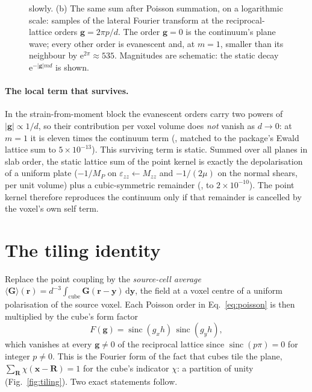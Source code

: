 \documentclass[extra,mreferee]{gji}
\newcommand{\bG}{\mathbf{G}}
\newcommand{\sinc}{\operatorname{sinc}}
\begin{document}
\begin{figure}
{slowly. (b) The same sum after Poisson summation, on a logarithmic scale: samples of the lateral Fourier
transform at the reciprocal-lattice orders $\mathbf g=2\pi p/d$. The order $\mathbf g=0$ is the
continuum's plane wave; every other order is evanescent and, at $m=1$, smaller than its neighbour by
$\mathrm{e}^{2\pi}\approx535$. Magnitudes are schematic: the static decay $\mathrm{e}^{-|\mathbf g|md}$ is
shown.}
\label{fig:poisson}
\par{}
\end{figure}

\paragraph{The local term that survives.} In the strain-from-moment block the evanescent orders carry two
powers of $|\mathbf g|\propto1/d$, so their contribution per voxel volume does \emph{not} vanish as
$d\to0$: at $m=1$ it is eleven times the continuum term (,
matched to the package's Ewald lattice sum to $5\times10^{-13}$). This surviving term is static.
Summed over all planes in slab order, the static lattice sum of the point kernel is exactly the
depolarisation of a uniform plate ($-1/M_P$ on $\varepsilon_{zz}\leftarrow M_{zz}$ and $-1/(2\mu)$
on the normal shears, per unit volume) plus a cubic-symmetric remainder
(, to $2\times10^{-10}$). The point kernel therefore reproduces
the continuum only if that remainder is cancelled by the voxel's own self term.

\section{The tiling identity}\label{sec:tiling}

Replace the point coupling by the \emph{source-cell average}
$\langle\bG\rangle(\mathbf r)=d^{-3}\int_{\text{cube}}\bG(\mathbf r-\mathbf y)\,\mathrm{d}\mathbf y$, the
field at a voxel centre of a uniform polarisation of the source voxel. Each Poisson order in
Eq.~\eqref{eq:poisson} is then multiplied by the cube's form factor
\begin{equation}
  F(\mathbf g)=\sinc(g_x h)\,\sinc(g_y h),
\end{equation}
which vanishes at every $\mathbf g\neq0$ of the reciprocal lattice since $\sinc(p\pi)=0$ for integer
$p\neq0$. This is the Fourier form of the fact that cubes tile the plane,
$\sum_{\mathbf R}\chi(\mathbf x-\mathbf R)=1$ for the cube's indicator $\chi$: a partition of unity
(Fig.~\ref{fig:tiling}). Two exact statements follow.
\end{document}

